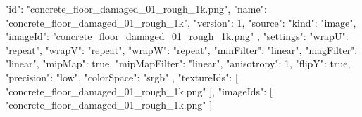 {
  "id": "concrete_floor_damaged_01_rough_1k.png",
  "name": "concrete_floor_damaged_01_rough_1k",
  "version": 1,
  "source": {
    "kind": "image",
    "imageId": "concrete_floor_damaged_01_rough_1k.png"
  },
  "settings": {
    "wrapU": "repeat",
    "wrapV": "repeat",
    "wrapW": "repeat",
    "minFilter": "linear",
    "magFilter": "linear",
    "mipMap": true,
    "mipMapFilter": "linear",
    "anisotropy": 1,
    "flipY": true,
    "precision": "low",
    "colorSpace": "srgb"
  },
  "textureIds": [
    "concrete_floor_damaged_01_rough_1k.png"
  ],
  "imageIds": [
    "concrete_floor_damaged_01_rough_1k.png"
  ]
}
